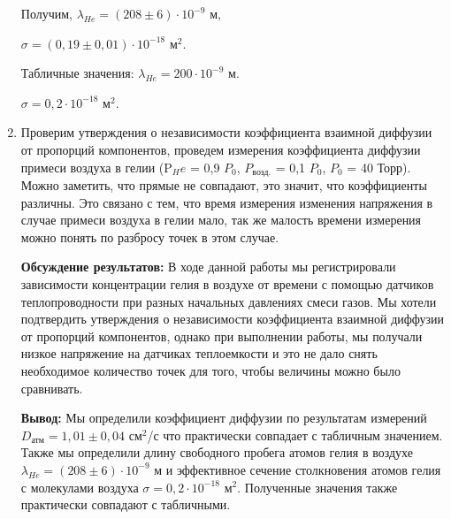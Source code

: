 \documentclass[a4paper, 12pt]{article}%
\begin{document}
\begin{enumerate}
Получим, $\lambda_{He} = (208 \pm 6)\cdot 10^{-9}$ м, 

 $\sigma = (0,19 \pm 0,01)\cdot 10^{-18}$ м$^2$. 
 
 Табличные значения: $\lambda_{He} = 200\cdot 10^{-9}$ м.
 
 $\sigma = 0,2 \cdot 10^{-18}$ м$^2$.


\item Проверим утверждения о независимости коэффициента взаимной
диффузии от пропорций компонентов, проведем измерения коэффициента диффузии примеси воздуха в гелии (P$_He$ = 0,9 $P_0$, $P_{\text {возд.}}$ = 0,1 $P_0$, $P_0$ = 40 Торр). Можно заметить, что прямые не совпадают, это значит, что коэффициенты различны. Это связано с тем, что время измерения изменения напряжения в случае примеси воздуха в гелии мало, так же малость времени измерения можно понять по разбросу точек в этом случае.

	\begin{figure}[h]
	\caption{}
\end{figure}


\textbf{Обсуждение результатов:} В ходе данной работы мы регистрировали зависимости концентрации гелия в воздухе от времени с помощью датчиков теплопроводности при разных начальных давлениях смеси газов. Мы хотели подтвердить утверждения о независимости коэффициента взаимной диффузии от пропорций компонентов, однако при выполнении работы, мы получали низкое напряжение на датчиках теплоемкости и это не дало снять необходимое количество точек для того, чтобы величины можно было сравнивать. 


\textbf{Вывод:}
Мы определили коэффициент диффузии по результатам измерений  $D_{\text{атм}} = 1,01 \pm 0,04$ см$^2$/с что практически совпадает с табличным значением.
Также мы определили длину свободного пробега атомов гелия в воздухе  $\lambda_{He} = (208 \pm 6)\cdot 10^{-9}$ м и эффективное сечение столкновения атомов гелия с молекулами воздуха  
$\sigma = 0,2 \cdot 10^{-18}$ м$^2$. Полученные значения также практически совпадают с табличными.

\end{enumerate}
\end{document}

